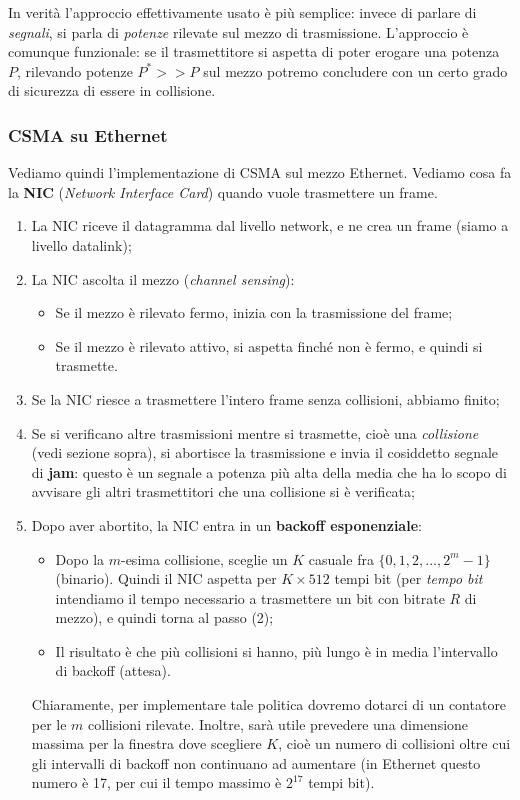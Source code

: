 \documentclass[a4paper,11pt]{article}
\begin{document}
In verità l'approccio effettivamente usato è più semplice: invece di parlare di \textit{segnali}, si parla di \textit{potenze} rilevate sul mezzo di trasmissione. L'approccio è comunque funzionale: se il trasmettitore si aspetta di poter erogare una potenza $P$, rilevando potenze $P^* >> P$ sul mezzo potremo concludere con un certo grado di sicurezza di essere in collisione.

\subsubsection{CSMA su Ethernet}
Vediamo quindi l'implementazione di CSMA sul mezzo Ethernet.
Vediamo cosa fa la \textbf{NIC} (\textit{Network Interface Card}) quando vuole trasmettere un frame.
\begin{enumerate}
	\item La NIC riceve il datagramma dal livello network, e ne crea un frame (siamo a livello datalink);
	\item La NIC ascolta il mezzo (\textit{channel sensing}):
		\begin{itemize}
			\item Se il mezzo è rilevato fermo, inizia con la trasmissione del frame;
			\item Se il mezzo è rilevato attivo, si aspetta finché non è fermo, e quindi si trasmette.
		\end{itemize}
	\item Se la NIC riesce a trasmettere l'intero frame senza collisioni, abbiamo finito;
	\item Se si verificano altre trasmissioni mentre si trasmette, cioè una \textit{collisione} (vedi sezione sopra), si abortisce la trasmissione e invia il cosiddetto segnale di \textbf{jam}: questo è un segnale a potenza più alta della media che ha lo scopo di avvisare gli altri trasmettitori che una collisione si è verificata;
	\item Dopo aver abortito, la NIC entra in un \textbf{backoff esponenziale}:
		\begin{itemize}
			\item Dopo la $m$-esima collisione, sceglie un $K$ casuale fra $\{ 0, 1, 2, ..., 2^m - 1 \}$ (binario). Quindi il NIC aspetta per $K \times 512$ tempi bit (per \textit{tempo bit} intendiamo il tempo necessario a trasmettere un bit con bitrate $R$ di mezzo), e quindi torna al passo (2);
			\item Il risultato è che più collisioni si hanno, più lungo è in media l'intervallo di backoff (attesa). 
		\end{itemize}
		Chiaramente, per implementare tale politica dovremo dotarci di un contatore per le $m$ collisioni rilevate. Inoltre, sarà utile prevedere una dimensione massima per la finestra dove scegliere $K$, cioè un numero di collisioni oltre cui gli intervalli di backoff non continuano ad aumentare (in Ethernet questo numero è 17, per cui il tempo massimo è $2^{17}$ tempi bit).
\end{enumerate}
\end{document}
